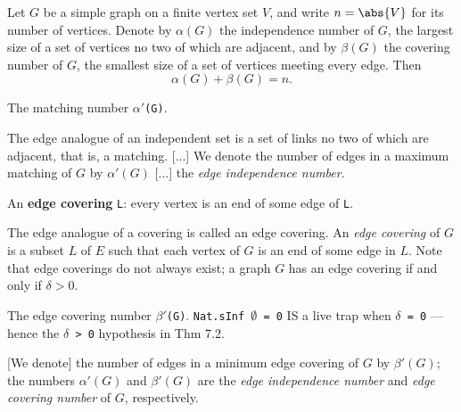 \begin{theorem}
\label{SimpleGraph.indepNum_add_coveringNumber}
Let $G$ be a simple graph on a finite vertex set $V$, and write $n = \abs{V}$ for its
number of vertices. Denote by $\alpha(G)$ the independence number of $G$, the largest
size of a set of vertices no two of which are adjacent, and by $\beta(G)$ the covering
number of $G$, the smallest size of a set of vertices meeting every edge. Then \[
\alpha(G) + \beta(G) = n. \]
\end{theorem}

\begin{definition}
\label{SimpleGraph.matchingNumber}
\leanok
The matching number \texttt{$\alpha$$'$(G)}.

The edge analogue of an independent set is a set of links no two of which are
adjacent, that is, a matching. [...] We denote the number of edges in a maximum
matching of $G$ by $\alpha'(G)$ [...] the \emph{edge independence number}.
\end{definition}

\begin{definition}
\label{SimpleGraph.IsEdgeCovering}
\leanok
An \textbf{edge covering} \texttt{L}: every vertex is an end of some edge of \texttt{L}.

The edge analogue of a covering is called an edge covering. An \emph{edge covering} of
$G$ is a subset $L$ of $E$ such that each vertex of $G$ is an end of some edge in $L$.
Note that edge coverings do not always exist; a graph $G$ has an edge covering if and
only if $\delta > 0$.
\end{definition}

\begin{definition}
\label{SimpleGraph.edgeCoveringNumber}
\leanok
{}
The edge covering number \texttt{$\beta$$'$(G)}. \texttt{Nat.sInf $\emptyset$ = 0} IS a
live trap when \texttt{$\delta$ = 0} --- hence the \texttt{$\delta$ > 0} hypothesis in
Thm 7.2.

[We denote] the number of edges in a minimum edge covering of $G$ by
$\beta'(G)$; the numbers $\alpha'(G)$ and $\beta'(G)$ are the \emph{edge
independence number} and \emph{edge covering number} of $G$, respectively.
\end{definition}

